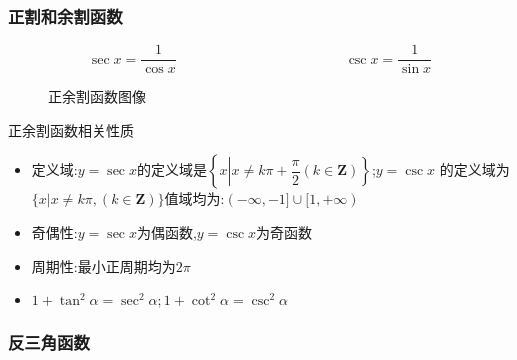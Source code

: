 \documentclass[8pt a4paper, oneside, UTF8]{ctexbook}  %
\begin{document}
\begin{sloppypar}
    \subsubsection{正割和余割函数}
    $$
        \boxed{\sec x=\frac{1}{\cos x}}
        \qquad  \qquad \qquad \qquad \qquad \qquad
        \boxed{\csc x=\frac{1}{\sin x}}
    $$
    \begin{figure}[H] \centering
        \caption{正余割函数图像}
    \end{figure}
    \begin{criterion}{正余割函数相关性质}{}
        \begin{itemize}
            \item 定义域:$y=\sec x$的定义域是$\left\{x\left|x\neq k\pi+\dfrac{\pi}{2}\left(k\in\mathbf{Z}\right)\right\}\right.$;$y=\csc x$ 的定义域为$\{x|x\neq k\pi,(k \in \mathbf{Z})\}$值域均为:$(-\infty,-1]\cup[1,+\infty)$
            \item 奇偶性:$y=\sec x$为偶函数,$y=\csc x$为奇函数
            \item 周期性:最小正周期均为$ 2\pi$
            \item $1+\tan^{2}\alpha=\sec^{2}\alpha;1+\cot^{2}\alpha=\csc^{2}\alpha $
        \end{itemize}
    \end{criterion}
    \subsubsection{反三角函数}

\end{sloppypar}
\end{document}
